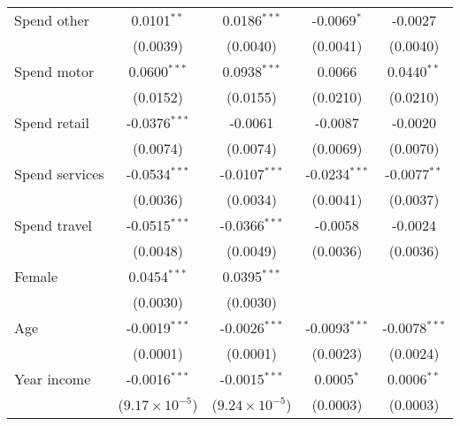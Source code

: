 \begin{table}[htbp]
\begin{normalsize}
\begin{tabular}{lcccc}
         Spend other                      & 0.0101$^{**}$           & 0.0186$^{***}$          & -0.0069$^{*}$   & -0.0027\\
                                          & (0.0039)                & (0.0040)                & (0.0041)        & (0.0040)\\
         Spend motor                      & 0.0600$^{***}$          & 0.0938$^{***}$          & 0.0066          & 0.0440$^{**}$\\
                                          & (0.0152)                & (0.0155)                & (0.0210)        & (0.0210)\\
         Spend retail                     & -0.0376$^{***}$         & -0.0061                 & -0.0087         & -0.0020\\
                                          & (0.0074)                & (0.0074)                & (0.0069)        & (0.0070)\\
         Spend services                   & -0.0534$^{***}$         & -0.0107$^{***}$         & -0.0234$^{***}$ & -0.0077$^{**}$\\
                                          & (0.0036)                & (0.0034)                & (0.0041)        & (0.0037)\\
         Spend travel                     & -0.0515$^{***}$         & -0.0366$^{***}$         & -0.0058         & -0.0024\\
                                          & (0.0048)                & (0.0049)                & (0.0036)        & (0.0036)\\
         Female                           & 0.0454$^{***}$          & 0.0395$^{***}$          &                 &   \\
                                          & (0.0030)                & (0.0030)                &                 &   \\
         Age                              & -0.0019$^{***}$         & -0.0026$^{***}$         & -0.0093$^{***}$ & -0.0078$^{***}$\\
                                          & (0.0001)                & (0.0001)                & (0.0023)        & (0.0024)\\
         Year income                      & -0.0016$^{***}$         & -0.0015$^{***}$         & 0.0005$^{*}$    & 0.0006$^{**}$\\
                                          & ($9.17\times 10^{-5}$) & ($9.24\times 10^{-5}$) & (0.0003)        & (0.0003)\\

\end{tabular}
\end{normalsize}
\end{table}
